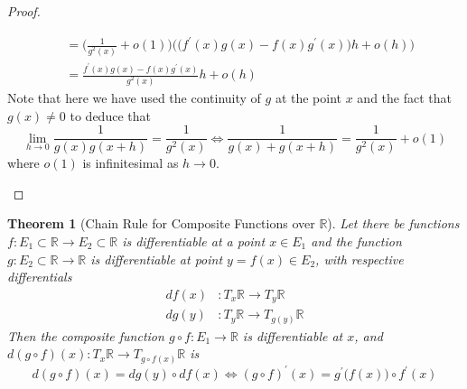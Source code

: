 \documentclass{article}
\newtheorem{theorem}{Theorem}[section]
\theoremstyle{remark}
\theoremstyle{definition}
\begin{document}
\begin{proof}
\begin{enumerate}
\begin{align*}
        & = \bigg(\frac{1}{g^2(x)} + o(1)\bigg) \Big(\big(f^\prime(x) g(x) - f(x) g^\prime(x)\big) h + o(h)\Big) \\
        & = \frac{f^\prime(x) g(x) - f(x) g^\prime(x)}{g^2 (x)} h + o(h)
    \end{align*}
    Note that here we have used the continuity of $g$ at the point $x$ and the fact that $g(x) \neq 0$ to deduce that
    \[\lim_{h \rightarrow 0} \frac{1}{g(x) g(x + h)} = \frac{1}{g^2(x)} \iff \frac{1}{g(x) + g(x + h)} = \frac{1}{g^2(x)} + o(1)\]
    where $o(1)$ is infinitesimal as $h \rightarrow 0$. 
\end{enumerate}
\end{proof}

\begin{theorem}[Chain Rule for Composite Functions over $\mathbb{R}$]
Let there be functions $f: E_1 \subset \mathbb{R} \longrightarrow E_2 \subset \mathbb{R}$ is differentiable at a point $x \in E_1$ and the function $g: E_2 \subset \mathbb{R} \longrightarrow \mathbb{R}$ is differentiable at point $y = f(x) \in E_2$, with respective differentials 
\begin{align*}
    df(x)& : T_x \mathbb{R} \longrightarrow T_y \mathbb{R} \\
    dg(y)& : T_y\mathbb{R} \longrightarrow T_{g(y)} \mathbb{R}
\end{align*}
Then the composite function $g \circ f: E_1 \longrightarrow \mathbb{R}$ is differentiable at $x$, and $d(g \circ f)(x): T_x \mathbb{R} \longrightarrow T_{g \circ f(x)} \mathbb{R}$ is
\[d(g \circ f)(x) = d g(y) \circ d f(x) \iff (g \circ f)^\prime (x) = g^\prime \big( f(x) \big) \circ f^\prime (x)\]
\end{theorem}
\end{document}
